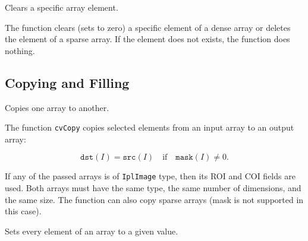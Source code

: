 \label{ClearND}

Clears a specific array element.


\begin{description}
\end{description}


The function  clears (sets to zero) a specific element of a dense array or deletes the element of a sparse array. If the element does not exists, the function does nothing.


\subsection{Copying and Filling}


\label{Copy}

Copies one array to another.


\begin{description}
\end{description}


The function \texttt{cvCopy} copies selected elements from an input array to an output array:

\[
\texttt{dst}(I)=\texttt{src}(I) \quad \text{if} \quad \texttt{mask}(I) \ne 0.
\]

If any of the passed arrays is of \texttt{IplImage} type, then its ROI
and COI fields are used. Both arrays must have the same type, the same
number of dimensions, and the same size. The function can also copy sparse
arrays (mask is not supported in this case).

\label{Set}

Sets every element of an array to a given value.


